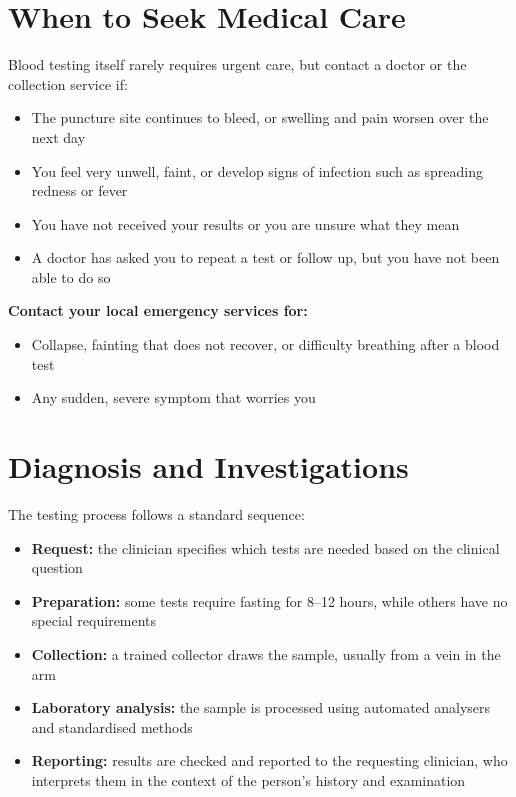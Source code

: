 \section*{When to Seek Medical Care}
Blood testing itself rarely requires urgent care, but contact a doctor or the collection service if:

\begin{itemize}
    \item The puncture site continues to bleed, or swelling and pain worsen over the next day
    \item You feel very unwell, faint, or develop signs of infection such as spreading redness or fever
    \item You have not received your results or you are unsure what they mean
    \item A doctor has asked you to repeat a test or follow up, but you have not been able to do so
\end{itemize}

\textbf{Contact your local emergency services for:}
\begin{itemize}
    \item Collapse, fainting that does not recover, or difficulty breathing after a blood test
    \item Any sudden, severe symptom that worries you
\end{itemize}

\section*{Diagnosis and Investigations}
The testing process follows a standard sequence:

\begin{itemize}
    \item \textbf{Request:} the clinician specifies which tests are needed based on the clinical question
    \item \textbf{Preparation:} some tests require fasting for 8--12 hours, while others have no special requirements
    \item \textbf{Collection:} a trained collector draws the sample, usually from a vein in the arm
    \item \textbf{Laboratory analysis:} the sample is processed using automated analysers and standardised methods
    \item \textbf{Reporting:} results are checked and reported to the requesting clinician, who interprets them in the context of the person's history and examination
\end{itemize}

